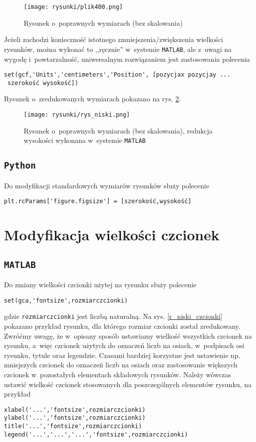 \begin{figure}[H]
\centering
\texttt{[image: rysunki/plik400.png]}
\caption{Rysunek o~poprawnych wymiarach (bez skalowania)}
\label{r_plik400}
\end{figure}

Jeżeli zachodzi konieczność istotnego zmniejszenia/zwiększenia wielkości rysunków, można wykonać to ,,ręcznie'' w~systemie \texttt{MATLAB}, ale z~uwagi na wygodę i~powtarzalność, uniwersalnym rozwiązaniem jest zastosowania polecenia
\begin{lstlisting}[style=custommatlab,frame=single]
set(gcf,'Units','centimeters','Position', [pozycjax pozycjay ...
 szerokość wysokość])
\end{lstlisting}
Rysunek o~zredukowanych wymiarach pokazano na rys. \ref{r_plik400_niski}.

\begin{figure}[H]
\centering
\texttt{[image: rysunki/rys\_niski.png]}
\caption{Rysunek o~poprawnych wymiarach (bez skalowania), redukcja wysokości wykonana w~systemie \texttt{MATLAB}}
\label{r_plik400_niski}
\end{figure}

\subsection{\texttt{Python}}
Do modyfikacji standardowych wymiarów rysunków służy polecenie
\begin{lstlisting}[style=custompython,frame=single]
plt.rcParams['figure.figsize'] = [szerokość,wysokość]
\end{lstlisting}

\section{Modyfikacja wielkości czcionek}
\subsection{\texttt{MATLAB}}
Do zmiany wielkości czcionki użytej na rysunku służy polecenie
\begin{lstlisting}[style=custommatlab,frame=single]
set(gca,'fontsize',rozmiarczcionki)
\end{lstlisting}
gdzie \verb|rozmiarczcionki| jest liczbą naturalną. Na rys. \ref{r_niski_czcionki} pokazano przykład rysunku, dla którego rozmiar czcionki został zredukowany. Zwróćmy uwagę, że w~opisany sposób ustawiamy wielkość wszystkich czcionek na rysunku, a~więc czcionek użytych do oznaczeń liczb na osiach, w~podpisach osi rysunku, tytule oraz legendzie. Czasami bardziej korzystne jest ustawienie np. mniejszych czcionek do oznaczeń liczb na osiach oraz zastosowanie większych czcionek w~pozostałych elementach składowych rysunków. Należy wówczas ustawić wielkość czcionek stosowanych dla poszczególnych elementów rysunku, na przykład
\begin{lstlisting}[style=custommatlab,frame=single]
xlabel('...','fontsize',rozmiarczcionki)
ylabel('...','fontsize',rozmiarczcionki)
title('...','fontsize',rozmiarczcionki)
legend('...','...','...','fontsize',rozmiarczcionki)
\end{lstlisting}

